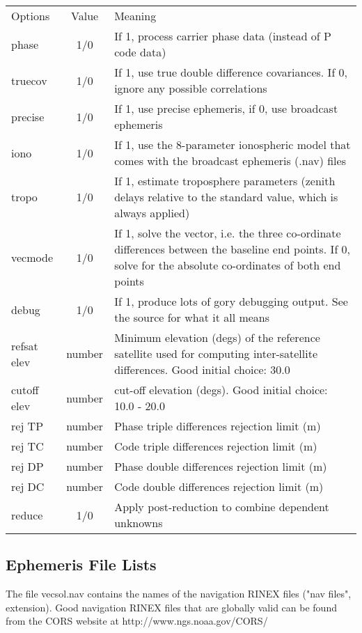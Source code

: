 \begin{tabular}{|l|c|p{3.0in}|} \hline

Options & Value & Meaning \\
phase   & 1/0   & If 1, process carrier phase data (instead of P code data) \\
truecov & 1/0   & If 1, use true double difference covariances. If 0, ignore any possible correlations \\
precise & 1/0   & If 1, use precise ephemeris, if 0, use broadcast ephemeris \\
iono    & 1/0   & If 1, use the 8-parameter ionospheric model that comes with the broadcast  ephemeris (.nav) files \\
tropo   & 1/0   & If 1, estimate troposphere parameters (zenith delays relative to the standard value, which is always applied) \\
vecmode & 1/0   & If 1, solve the vector, i.e. the three co-ordinate differences between the  baseline end points. If 0, solve for the absolute co-ordinates of both end points \\
debug   & 1/0   & If 1, produce lots of gory debugging output. See the source for what it all means \\
refsat elev & number & Minimum elevation (degs) of the reference satellite used for computing inter-satellite differences.  Good initial choice: 30.0 \\
cutoff elev & number & cut-off elevation (degs). Good initial choice: 10.0 - 20.0 \\
\hline
rej TP & number & Phase triple differences rejection limit (m) \\
rej TC & number & Code triple differences rejection limit (m) \\
rej DP & number & Phase double differences rejection limit (m) \\
rej DC & number & Code double differences rejection limit (m) \\
\hline
reduce & 1/0 & Apply post-reduction to combine dependent unknowns \\
\hline
\end{tabular}

\subsection{Ephemeris File Lists}
The file vecsol.nav contains the names of the navigation RINEX files ("nav files", extension). Good navigation RINEX files that are globally valid can be found  from  the  CORS  website  at http://www.ngs.noaa.gov/CORS/

